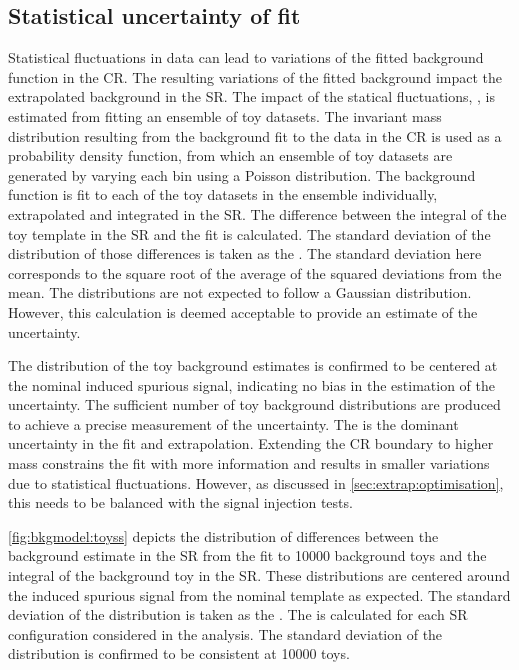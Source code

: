 \subsection{Statistical uncertainty of fit}\label{sec:uncertBkgmodel:statu}
Statistical fluctuations in data can lead to variations of the fitted background function in the CR. The resulting variations of the fitted background impact the extrapolated background in the SR. The impact of the statical fluctuations, \STATU, is estimated from fitting an ensemble of toy datasets. The invariant mass distribution resulting from the background fit to the data in the CR is used as a probability density function, from which an ensemble of toy datasets are generated by varying each bin using a Poisson distribution. The background function is fit to each of the toy datasets in the ensemble individually, extrapolated and integrated in the SR. The difference between the integral of the toy template in the SR and the fit is calculated. The standard deviation of the distribution of those differences is taken as the \STATU. The standard deviation here corresponds to  the square root of the average of the squared deviations from the mean. The distributions are not expected to follow a Gaussian distribution. However, this calculation is deemed acceptable to provide an estimate of the uncertainty.

The distribution of the toy background estimates is confirmed to be centered at the nominal induced spurious signal, indicating no bias in the estimation of the uncertainty. The sufficient number of toy background distributions are produced to achieve a precise measurement of the uncertainty. The \STATU is the dominant uncertainty in the fit and extrapolation. Extending the CR boundary to higher mass constrains the fit with more information and results in smaller variations due to statistical fluctuations. However, as discussed in \cref{sec:extrap:optimisation}, this needs to be balanced with the signal injection tests.

\cref{fig:bkgmodel:toyss} depicts the distribution of differences between the background estimate in the SR from the fit to 10000 background toys and the integral of the background toy in the SR. These distributions are centered around the induced spurious signal from the nominal template as expected. The standard deviation of the distribution is taken as the \STATU. The \ISSU is calculated for each SR configuration considered in the analysis. The standard deviation of the distribution is confirmed to be consistent at 10000 toys. 

